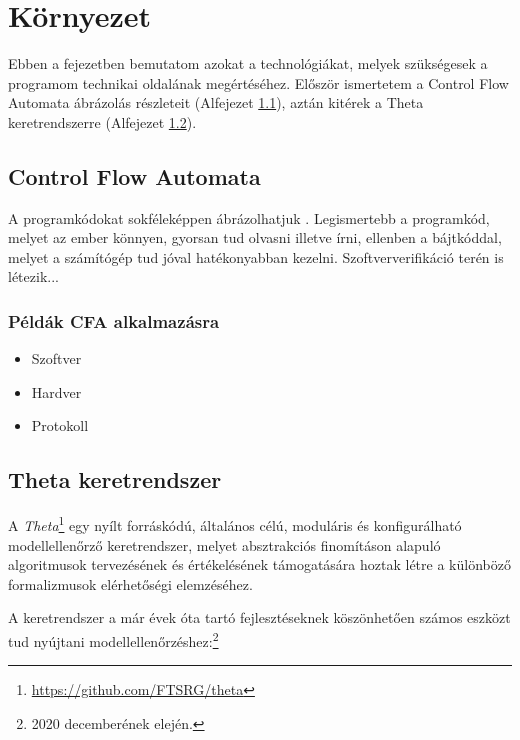 \chapter{Környezet}

Ebben a fejezetben bemutatom azokat a technológiákat, melyek szükségesek a programom technikai oldalának megértéséhez. Először ismertetem a Control Flow Automata ábrázolás részleteit (Alfejezet \ref{sec:kornyezet_cfa}), aztán kitérek a Theta keretrendszerre (Alfejezet \ref{sec:kornyezet_theta}).

\section{Control Flow Automata}
\label{sec:kornyezet_cfa}

A programkódokat sokféleképpen ábrázolhatjuk \cite{soft_ver_akos}. Legismertebb a programkód, melyet az ember könnyen, gyorsan tud olvasni illetve írni, ellenben a bájtkóddal, melyet a számítógép tud jóval hatékonyabban kezelni. Szoftververifikáció terén is létezik...

\subsection{Példák CFA alkalmazásra}
\label{sec:kornyezet_peldak}

\begin{itemize}
	\item Szoftver
	
	\item Hardver
	
	\item Protokoll
\end{itemize}

\section{Theta keretrendszer}
\label{sec:kornyezet_theta}

A \emph{Theta}\footnote{\url{https://github.com/FTSRG/theta}} egy nyílt forráskódú, általános célú, moduláris és konfigurálható modellellenőrző keretrendszer, melyet absztrakciós finomításon alapuló algoritmusok tervezésének és értékelésének támogatására hoztak létre a különböző formalizmusok elérhetőségi elemzéséhez.

A keretrendszer a már évek óta tartó fejlesztéseknek köszönhetően számos eszközt tud nyújtani modellellenőrzéshez:\footnote{2020 decemberének elején.}

